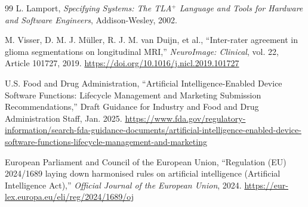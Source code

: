 \documentclass[preprint,11pt]{elsarticle}
\begin{document}
\begin{thebibliography}{99}
L. Lamport,
\emph{Specifying Systems: The TLA$^{+}$ Language and Tools for Hardware and Software Engineers},
Addison-Wesley, 2002.

M. Visser, D. M. J. M\"uller, R. J. M. van Duijn, et al.,
``Inter-rater agreement in glioma segmentations on longitudinal MRI,''
\emph{NeuroImage: Clinical}, vol. 22, Article 101727, 2019.
\url{https://doi.org/10.1016/j.nicl.2019.101727}

U.S. Food and Drug Administration,
``Artificial Intelligence-Enabled Device Software Functions: Lifecycle Management and Marketing Submission Recommendations,''
Draft Guidance for Industry and Food and Drug Administration Staff, Jan. 2025.
\url{https://www.fda.gov/regulatory-information/search-fda-guidance-documents/artificial-intelligence-enabled-device-software-functions-lifecycle-management-and-marketing}

European Parliament and Council of the European Union,
``Regulation (EU) 2024/1689 laying down harmonised rules on artificial intelligence (Artificial Intelligence Act),''
\emph{Official Journal of the European Union}, 2024.
\url{https://eur-lex.europa.eu/eli/reg/2024/1689/oj}

\end{thebibliography}
\end{document}
